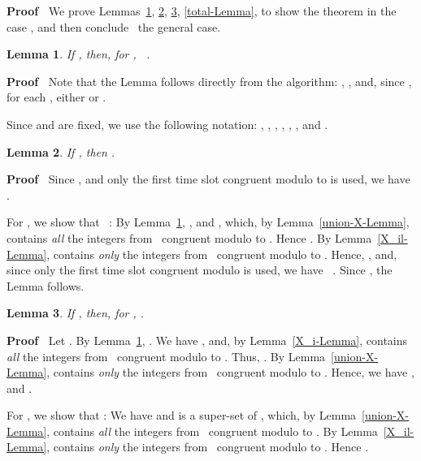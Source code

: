 \documentclass{article}
\newcommand{\tmem}[1]{{\em #1\/}}
\newenvironment{proof}{\noindent\textbf{Proof\ }}{\hspace*{\fill}\medskip}
\newtheorem{lemma}{Lemma}
\begin{document}
\begin{proof}
  We prove Lemmas~\ref{clipped-Lemma}, \ref{first-tree-Lemma},
  \ref{next-tree-Lemma}, \ref{total-Lemma}, to show the theorem in the case
  , and then conclude \ the
  general case.
  
  \begin{lemma}
    \label{clipped-Lemma} If , then, for , \ .
  \end{lemma}
  
  \begin{proof}
    Note that the Lemma follows directly from
    the algorithm: , , and, since
    , for each , either  or . 
  \end{proof}
  
  Since  and  are fixed, we use the following notation: , , , , , , and .
  
  \begin{lemma}
    \label{first-tree-Lemma} If , then .
  \end{lemma}
  
  \begin{proof}
    Since , and only the
    first time slot congruent modulo  to  is used, we have .
    
    For , we show that \ : By Lemma~\ref{clipped-Lemma},
    , and , which, by Lemma~\ref{union-X-Lemma}, contains
    {\tmem{all}} the integers from  \ congruent modulo  to . Hence . By Lemma~\ref{X_il-Lemma},
     contains {\tmem{only}} the integers from  \
    congruent modulo  to .
    Hence, , and, since only the first time slot congruent modulo  is used,
    we have \ .
    Since , the Lemma follows.
  \end{proof}
  
  \begin{lemma}
    \label{next-tree-Lemma} If , then, for , .
  \end{lemma}
  
  \begin{proof}
    Let . By
    Lemma~\ref{clipped-Lemma}, . We have , and, by Lemma~\ref{X_i-Lemma},  contains
    {\tmem{all}} the integers from  \ congruent modulo  to . Thus, . By Lemma~\ref{union-X-Lemma},
     contains {\tmem{only}} the integers
    from  \ congruent modulo  to
    . Hence, we have , and .
    
    For , we show that : We have  and  is a
    super-set of , which, by
    Lemma~\ref{union-X-Lemma}, contains {\tmem{all}} the integers from  \ congruent modulo  to . By
    Lemma~\ref{X_il-Lemma},  contains {\tmem{only}} the integers
    from  \ congruent modulo  to . Hence . 


\end{proof}
\end{proof}
\end{document}
